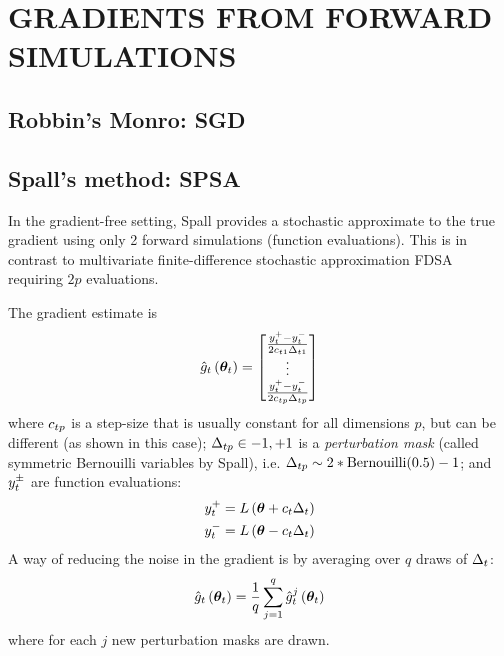 \documentclass[]{article}
\begin{document}
\section{GRADIENTS FROM FORWARD SIMULATIONS} \label{gradsforward}

\subsection{Robbin's Monro: SGD}




\subsection{Spall's method: SPSA}
In the gradient-free setting, Spall \cite{spall_spsa} provides a stochastic approximate to the true gradient using only 2 forward simulations (function evaluations).  This is in contrast to multivariate finite-difference stochastic approximation FDSA \cite{kiefer1952} requiring $2p$ evaluations.  

The gradient estimate is
\begin{equation}
  \gradestimate{t}{\thetav_t} = \begin{bmatrix} 
                                   \frac{\feval{t}{+} - \feval{t}{-}}{2 \cstep{t}{1} \dstep{t}{1}} \\
                                   \vdots \\
                                   \frac{\feval{t}{+} - \feval{t}{-}}{2 \cstep{t}{p} \dstep{t}{p}} \\
                                \end{bmatrix}
\end{equation}
where $\cstep{t}{p}$ is a step-size that is usually constant for all dimensions $p$, but can be different (as shown in this case); $\dstep{t}{p} \in {-1, +1}$ is a {\em perturbation mask} (called symmetric Bernouilli variables by Spall), i.e. $\dstep{t}{p} \sim 2*\text{Bernouilli}(0.5) - 1$; and  $\feval{t}{\pm}$ are function evaluations:
\begin{eqnarray}
  \feval{t}{+} &= \loglik{\thetav + \cstepconst{t}\dstepconst{t}} \\
  \feval{t}{-} &= \loglik{\thetav - \cstepconst{t}\dstepconst{t}}
\end{eqnarray}
A way of reducing the noise in the gradient is by averaging over $q$ draws of $\dstepconst{t}$:
\begin{equation}
  \gradestimate{t}{\thetav_t} = \frac{1}{q} \sum_{j=1}^q \gradestimaterepeat{t}{\thetav_t}{j}
\end{equation}
where for each $j$ new perturbation masks are drawn.  
\end{document}
